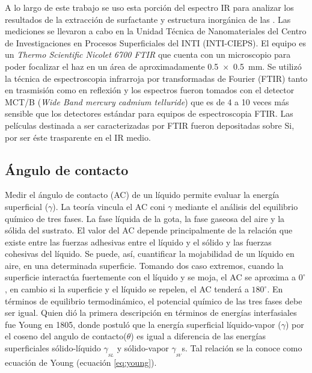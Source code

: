 		A lo largo de este trabajo se uso esta porción del espectro IR para analizar los resultados de la extracción de surfactante y estructura inorgánica de las \pdm. Las mediciones se llevaron a cabo en la Unidad Técnica de Nanomateriales del Centro de Investigaciones en Procesos Superficiales del INTI (INTI-CIEPS). El equipo es un \textit{Thermo Scientific Nicolet 6700 FTIR} que cuenta con un microscopio para poder focalizar el haz en un área de aproximadamente \SI{0.5x0.5}{\mm}. Se utilizó la técnica de espectroscopia infrarroja por transformadas de Fourier (FTIR) tanto en trasmisión como en reflexión y los espectros fueron tomados con el detector MCT/B (\textit{Wide Band mercury cadmium telluride}) que es de 4 a 10 veces más sensible que los detectores estándar para equipos de espectroscopia FTIR.\cite{Nicholet2007} Las películas destinada a ser caracterizadas por FTIR fueron depositadas sobre Si, por ser éste trasparente en el IR medio.

	\subsection{Ángulo de contacto}

		Medir el ángulo de contacto (AC) de un líquido permite evaluar la energía superficial ($\gamma$). La teoría vincula el AC coni $\gamma$ mediante el análisis del equilibrio químico de tres fases. La fase líquida de la gota, la fase gaseosa del aire y la sólida del sustrato. El valor del AC depende principalmente de la relación que existe entre las fuerzas adhesivas entre el líquido y el sólido y las fuerzas cohesivas del líquido. Se puede, así, cuantificar la mojabilidad de un líquido en aire, en una determinada superficie.\cite{findenegg1997} Tomando dos caso extremos, cuando la superficie interactúa fuertemente con el líquido y se moja, el AC se aproxima a $0^{\circ}$, en cambio si la superficie y el líquido se repelen, el AC tenderá a $180^{\circ}$. En términos de equilibrio termodinámico, el potencial químico de las tres fases  debe ser igual. Quien dió la primera descripción en términos de energías interfasiales fue Young en 1805\cite{young1805}, donde postuló que la energía superficial líquido-vapor ($\gamma$) por el coseno del angulo de contacto($\theta$) es igual a diferencia de las energías superficiales sólido-líquido $\gamma_{_{SL}}$ y sólido-vapor $\gamma_{_{SV}}$s. Tal relación se la conoce como ecuación de Young (ecuación \ref{eq:young}).

